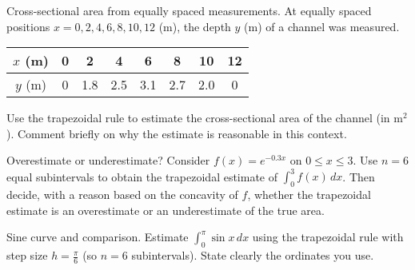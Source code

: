 \documentclass[11pt]{article}
\def\textbf#1{#1}%
\newcounter{question}
\begin{document}
\begin{question}
\textbf{Cross-sectional area from equally spaced measurements.}
At equally spaced positions \(x=0,2,4,6,8,10,12\) (m), the depth \(y\) (m) of a channel was measured.

\begin{center}
\begin{tabular}{c|ccccccc}
\(x\) (m) & 0 & 2 & 4 & 6 & 8 & 10 & 12\\\hline
\(y\) (m) & 0 & 1.8 & 2.5 & 3.1 & 2.7 & 2.0 & 0
\end{tabular}
\end{center}

Use the trapezoidal rule to estimate the cross-sectional area of the channel (in m\(^2\)).
Comment briefly on why the estimate is reasonable in this context.
\end{question}

\begin{question}
\textbf{Overestimate or underestimate?}
Consider \(f(x)=e^{-0.3x}\) on \(0\le x\le 3\). Use \(n=6\) equal subintervals to obtain the trapezoidal estimate of
\(\displaystyle \int_{0}^{3} f(x)\,dx\).
Then decide, with a reason based on the concavity of \(f\), whether the trapezoidal estimate is an overestimate or an underestimate of the true area.

\begin{center}
\end{center}
\end{question}

\begin{question}
\textbf{Sine curve and comparison.}
Estimate \(\displaystyle \int_{0}^{\pi} \sin x\,dx\) using the trapezoidal rule with step size
\(h=\frac{\pi}{6}\) (so \(n=6\) subintervals).
State clearly the ordinates you use.
\end{question}
\end{document}

